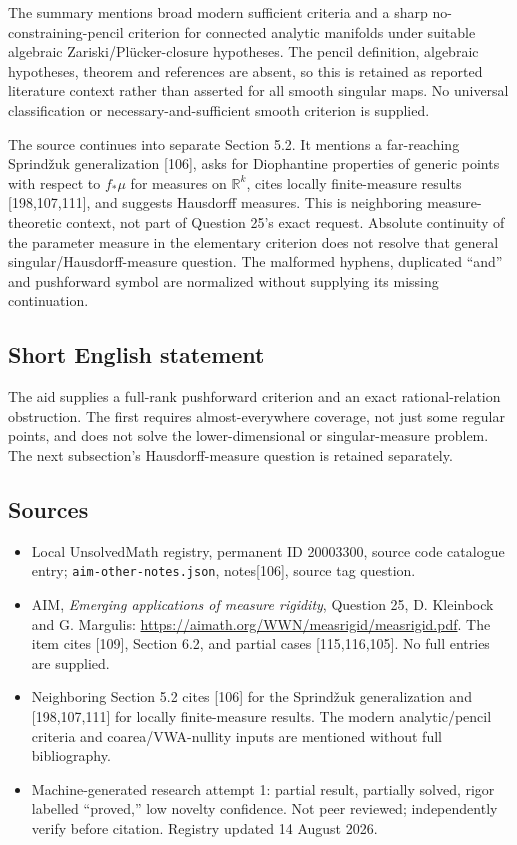 \documentclass[11pt]{article}
\newcommand{\R}{\mathbb{R}}
\begin{document}
The summary mentions broad modern sufficient criteria and a sharp no-constraining-pencil criterion for connected analytic manifolds under suitable algebraic Zariski/Pl\"ucker-closure hypotheses. The pencil definition, algebraic hypotheses, theorem and references are absent, so this is retained as reported literature context rather than asserted for all smooth singular maps. No universal classification or necessary-and-sufficient smooth criterion is supplied.

The source continues into separate Section 5.2. It mentions a far-reaching Sprind\v{z}uk generalization [106], asks for Diophantine properties of generic points with respect to $f_*\mu$ for measures on $\R^k$, cites locally finite-measure results [198,107,111], and suggests Hausdorff measures. This is neighboring measure-theoretic context, not part of Question 25's exact request. Absolute continuity of the parameter measure in the elementary criterion does not resolve that general singular/Hausdorff-measure question. The malformed hyphens, duplicated ``and'' and pushforward symbol are normalized without supplying its missing continuation.
\subsection{Short English statement}
The aid supplies a full-rank pushforward criterion and an exact rational-relation obstruction. The first requires almost-everywhere coverage, not just some regular points, and does not solve the lower-dimensional or singular-measure problem. The next subsection’s Hausdorff-measure question is retained separately.
\subsection{Sources}
\begin{itemize}
\item Local UnsolvedMath registry, permanent ID 20003300, source code catalogue entry; \texttt{aim-other-notes.json}, notes[106], source tag question.
\item AIM, \emph{Emerging applications of measure rigidity}, Question 25, D. Kleinbock and G. Margulis: \url{https://aimath.org/WWN/measrigid/measrigid.pdf}. The item cites [109], Section 6.2, and partial cases [115,116,105]. No full entries are supplied.
\item Neighboring Section 5.2 cites [106] for the Sprind\v{z}uk generalization and [198,107,111] for locally finite-measure results. The modern analytic/pencil criteria and coarea/VWA-nullity inputs are mentioned without full bibliography.
\item Machine-generated research attempt 1: partial result, partially solved, rigor labelled ``proved,'' low novelty confidence. Not peer reviewed; independently verify before citation. Registry updated 14 August 2026.
\end{itemize}
\end{document}
